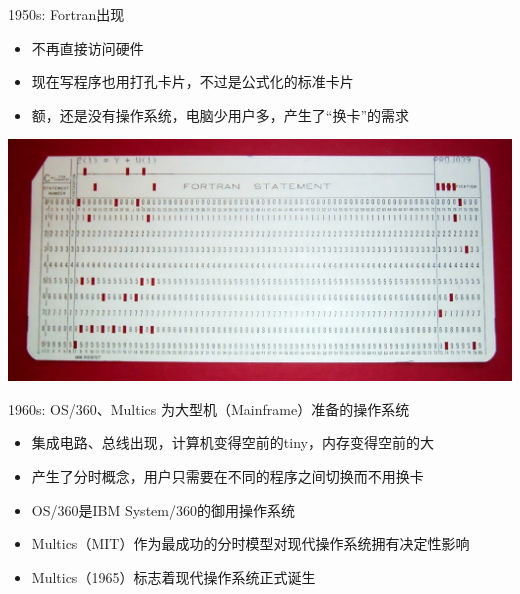 \documentclass[aspectratio=1610]{beamer}
\begin{document}
\begin{frame}{1950s: Fortran出现}
    \begin{itemize}
        \item 不再直接访问硬件
        \item 现在写程序也用打孔卡片，不过是公式化的标准卡片
        \item 额，还是没有操作系统，电脑少用户多，产生了“换卡”的需求
    \end{itemize}
    \begin{minipage}{\textwidth}
        \centering
        \includegraphics[height=0.35\textwidth]{pic/FortranCardPROJ039.agr.jpg}
    \end{minipage}
\end{frame}

\begin{frame}{1960s: OS/360、Multics}
    为大型机（Mainframe）准备的操作系统
    \begin{itemize}
        \item 集成电路、总线出现，计算机变得空前的tiny，内存变得空前的大
        \item 产生了分时概念，用户只需要在不同的程序之间切换而不用换卡
        \item OS/360是IBM System/360的御用操作系统
        \item \alert{Multics}（MIT）作为最成功的分时模型对现代操作系统拥有决定性影响
        \item Multics（1965）标志着现代操作系统正式诞生
    \end{itemize}
\end{frame}
\end{document}
